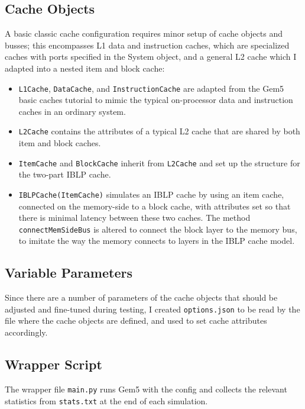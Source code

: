 \documentclass[12pt,twoside]{reedthesis}
\begin{document}
	\subsection*{Cache Objects}

	A basic classic cache configuration requires minor setup of cache objects and busses; this encompasses L1 data and instruction caches, which are specialized caches with ports specified in the System object, and a general L2 cache which I adapted into a nested item and block cache:

	\begin{itemize}
		\item \verb`L1Cache`, \verb`DataCache`, and \verb`InstructionCache` are adapted from the Gem5 basic caches tutorial to mimic the typical on-processor data and instruction caches in an ordinary system.
	
		\item \verb`L2Cache` contains the attributes of a typical L2 cache that are shared by both item and block caches.
	
		\item \verb`ItemCache` and \verb`BlockCache` inherit from \verb`L2Cache` and set up the structure for the two-part IBLP cache.
	
		\item \verb`IBLPCache(ItemCache)` simulates an IBLP cache by using an item cache, connected on the memory-side to a block cache, with attributes set so that there is minimal latency between these two caches. The method \verb`connectMemSideBus` is altered to connect the block layer to the memory bus, to imitate the way the memory connects to layers in the IBLP cache model.
	\end{itemize}

	\subsection*{Variable Parameters}

	Since there are a number of parameters of the cache objects that should be adjusted and fine-tuned during testing, I created \verb`options.json` to be read by the file where the cache objects are defined, and used to set cache attributes accordingly.

	\subsection*{Wrapper Script}

	The wrapper file \verb`main.py` runs Gem5 with the config and collects the relevant statistics from \verb`stats.txt` at the end of each simulation.
\end{document}
